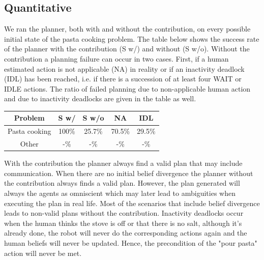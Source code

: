 \documentclass[letterpaper]{article} %
\begin{document}
\subsection{Quantitative}

We ran the planner, both with and without the contribution, on every possible initial state of the pasta cooking problem. The table below shows the success rate of the planner with the contribution (S w/) and without (S w/o). Without the contribution a planning failure can occur in two cases. First, if a human estimated action is not applicable (NA) in reality  or if an inactivity deadlock (IDL) has been reached, i.e. if there is a succession of at least four WAIT or IDLE actions. The ratio of failed planning due to non-applicable human action and due to inactivity deadlocks are given in the table as well.

\begin{tabular}{|c|c|c|c|c|}
    \hline
    \textbf{Problem} & \textbf{S w/} & \textbf{S w/o} & \textbf{NA} & \textbf{IDL}\\
    \hline
    Pasta cooking & 100\% & 25.7\% & 70.5\% & 29.5\%\\
    \hline
    Other & -\% & -\% & -\% & -\%\\
    \hline 
\end{tabular}

With the contribution the planner always find a valid plan that may include communication. When there are no initial belief divergence the planner without the contribution always finds a valid plan. However, the plan generated will always the agents as omniscient which may later lead to ambiguities when executing the plan in real life. Most of the scenarios that include belief divergence leads to non-valid plans without the contribution. Inactivity deadlocks occur when the human thinks the stove is off or that there is no salt, although it's already done, the robot will never do the corresponding actions again and the human beliefs will never be updated. Hence, the precondition of the "pour pasta" action will never be met.
\end{document}
